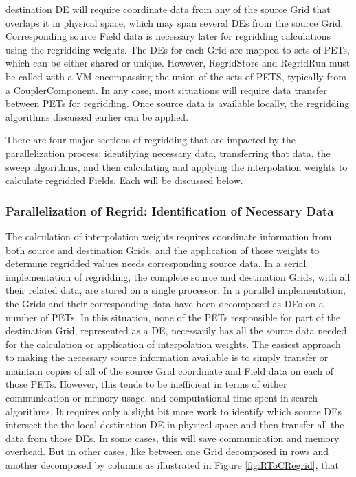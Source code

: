 destination DE will require coordinate data from any of the source Grid that
overlaps it in physical space, which may span several DEs from the source Grid.
Corresponding source Field data is necessary later for regridding calculations
using the regridding weights.  The DEs for each Grid are mapped to sets of PETs,
which can be either shared or unique.  However, RegridStore and RegridRun must
be called with a VM encompassing the union of the sets of PETS, typically from
a CouplerComponent.  In any case, most situations will require data transfer
between PETs for regridding.  Once source data is available locally, the
regridding algorithms discussed earlier can be applied.

There are four major sections of regridding that are impacted by the
parallelization process: identifying necessary data, transferring that data, the
sweep algorithms, and then calculating and applying the interpolation weights to
calculate regridded Fields.  Each will be discussed below.


\subsubsection{Parallelization of Regrid: Identification of Necessary Data}

The calculation of interpolation weights requires coordinate information from
both source and destination Grids, and the application of those weights to
determine regridded values needs corresponding source data.  In a serial
implementation of regridding, the complete source and destination Grids, with
all their related data, are stored on a single processor.  In a parallel
implementation, the Grids and their corresponding data have been decomposed as
DEs on a number of PETs.  In this situation, none of the PETs responsible for
part of the destination Grid, represented as a DE, necessarily has all the source
data needed for the calculation or application of interpolation weights.  The
easiest approach to making the necessary source information available is to
simply transfer or maintain copies of all of the source Grid coordinate and Field
data on each of those PETs.  However, this tends to be inefficient in terms of
either communication or memory usage, and computational time spent in search
algorithms.  It requires only a slight bit more work to identify which source DEs
intersect the the local destination DE in physical space and then transfer all
the data from those DEs.  In some cases, this will save communication and memory
overhead.  But in other cases, like between one Grid decomposed in rows and
another decomposed by columns as illustrated in Figure \ref{fig:RToCRegrid}, that

